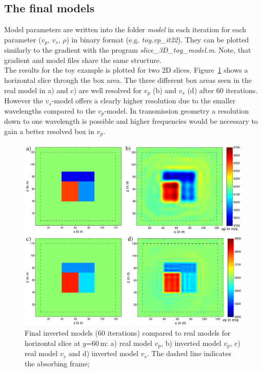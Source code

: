 \subsection{The final models}
Model parameters are written into the folder \textit{model} in each iteration for each parameter ($v_p$, $v_s$, $\rho$) in binary format (e.g. \textit{toy.vp\_it22}). They can be plotted similarly to the gradient with the program \textit{slice\_3D\_toy\_model.m}. Note, that gradient and model files share the same structure.\\
The results for the toy example is plotted for two 2D slices. Figure~\ref{fig:toy_result1} shows a horizontal slice through the box area. The three different box areas seen in the real model in a) and c) are well resolved for $v_p$ (b) and $v_s$ (d) after 60 iterations. However the $v_s$-model offers a clearly higher resolution due to the smaller wavelengths compared to the $v_p$-model. In transmission geometry a resolution down to one wavelength is possible and higher frequencies would be necessary to gain a better resolved box in $v_p$.
\begin{figure}[h!]
\begin{center}
\includegraphics[width=\textwidth]{fig_toy/toy_model_result}
\caption[Toy example - final inverted models, horizontal slice]{Final inverted models (60 iterations) compared to real models for horizontal slice at $y$=60\,m: a) real model $v_p$, b) inverted  model $v_p$, c) real model $v_s$ and d) inverted model $v_s$. The dashed line indicates the absorbing frame;  }\label{fig:toy_result1}
\end{center}
\end{figure}
